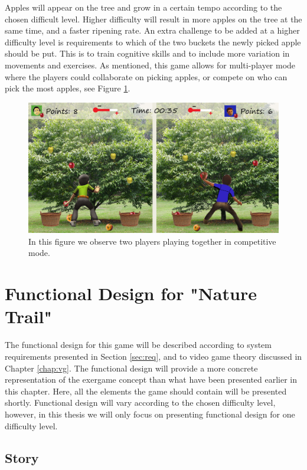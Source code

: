Apples will appear on the tree and grow in a certain tempo according to the chosen difficult level. Higher difficulty will result in more apples on the tree at the same time, and a faster ripening rate. An extra challenge to be added at a higher difficulty level is requirements to which of the two buckets the newly picked apple should be put. This is to train cognitive skills and to include more variation in movements and exercises. As mentioned, this game allows for multi-player mode where the players could collaborate on picking apples, or compete on who can pick the most apples, see Figure \ref{fig:appleMultiplayer}. 


\begin{figure} [H]
\centering
\includegraphics[scale=0.075]{gameapple2playerEngelsk.jpg}
\caption[Picking apples - multi-player]{In this figure we observe two players playing together in competitive mode.}
\label{fig:appleMultiplayer}
\end{figure}


\section{Functional Design for "Nature Trail"}
\label{sec:designnature}
The functional design for this game will be described according to system requirements presented in Section \ref{sec:req}, and to video game theory discussed in Chapter \ref{chap:vg}. The functional design will provide a more concrete representation of the exergame concept than what have been presented earlier in this chapter. Here, all the elements the game should contain will be presented shortly. Functional design will vary according to the chosen difficulty level, however, in this thesis we will only focus on presenting functional design for one difficulty level.

\subsection{Story} 

